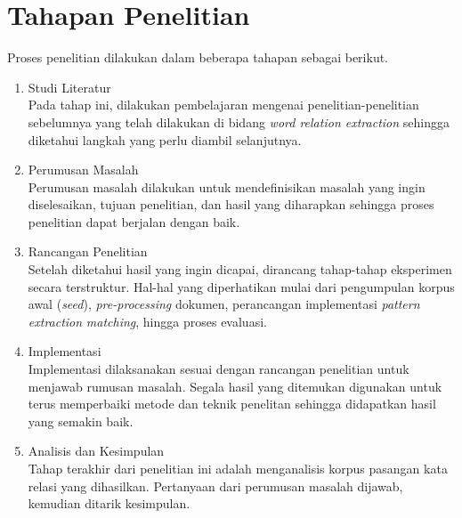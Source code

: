 \section{Tahapan Penelitian}
Proses penelitian dilakukan dalam beberapa tahapan sebagai berikut.
\begin{enumerate}
	\item Studi Literatur \\
	Pada tahap ini, dilakukan pembelajaran mengenai penelitian-penelitian sebelumnya yang telah dilakukan di bidang \textit{word relation extraction} sehingga diketahui langkah yang perlu diambil selanjutnya.
	\item Perumusan Masalah \\
	Perumusan masalah dilakukan untuk mendefinisikan masalah yang ingin diselesaikan, tujuan penelitian, dan hasil yang diharapkan sehingga proses penelitian dapat berjalan dengan baik.
	\item Rancangan Penelitian \\
	Setelah diketahui hasil yang ingin dicapai, dirancang tahap-tahap eksperimen secara terstruktur. Hal-hal yang diperhatikan mulai dari pengumpulan korpus awal (\textit{seed}), \textit{pre-processing} dokumen, perancangan implementasi \textit{pattern extraction} \textit{matching}, hingga proses evaluasi.
	\item Implementasi \\
	Implementasi dilaksanakan sesuai dengan rancangan penelitian untuk menjawab rumusan masalah. Segala hasil yang ditemukan digunakan untuk terus memperbaiki metode dan teknik penelitan sehingga didapatkan hasil yang semakin baik.
	\item Analisis dan Kesimpulan \\
	Tahap terakhir dari penelitian ini adalah menganalisis korpus pasangan kata relasi yang dihasilkan. Pertanyaan dari perumusan masalah dijawab, kemudian ditarik kesimpulan.
	
\end{enumerate}


